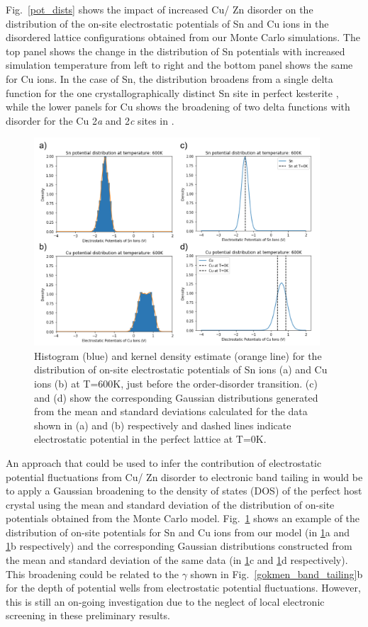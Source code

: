 \documentclass[11pt, twoside]{report}
\begin{document}
Fig.~\ref{pot_dists} shows the impact of increased Cu/ Zn disorder on the distribution of the on-site electrostatic potentials of Sn and Cu ions in the disordered lattice configurations obtained from our Monte Carlo simulations. The top panel shows the change in the distribution of Sn potentials with increased simulation temperature from left to right and the bottom panel shows the same for Cu ions. In the case of Sn, the distribution broadens from a single delta function for the one crystallographically distinct Sn site in perfect kesterite {\CZTS}, while the lower panels for Cu shows the broadening of two delta functions with disorder for the Cu 2\textit{a} and 2\textit{c} sites in {\CZTS}.

\begin{figure}[]
  \centering
    \includegraphics[width=0.95\textwidth]{figures/kde+gaussian.png}
    \caption{Histogram (blue) and kernel density estimate (orange line) for the distribution of on-site electrostatic potentials of Sn ions (a) and Cu ions (b) at T=600K, just before the order-disorder transition. (c) and (d) show the corresponding Gaussian distributions generated from the mean and standard deviations calculated for the data shown in (a) and (b) respectively and dashed lines indicate electrostatic potential in the perfect lattice at T=0K.}
  \label{kde+gaussian}
\end{figure}

An approach that could be used to infer the contribution of electrostatic potential fluctuations from Cu/ Zn disorder to electronic band tailing in {\CZTS} would be to apply a Gaussian broadening to the density of states (DOS) of the perfect host crystal using the mean and standard deviation of the distribution of on-site potentials obtained from the Monte Carlo model. Fig.~\ref{kde+gaussian} shows an example of the distribution of on-site potentials for Sn and Cu ions from our model (in \ref{kde+gaussian}a and \ref{kde+gaussian}b respectively) and the corresponding Gaussian distributions constructed from the mean and standard deviation of the same data (in \ref{kde+gaussian}c and \ref{kde+gaussian}d respectively). This broadening could be related to the $\gamma$ shown in Fig.~\ref{gokmen_band_tailing}b for the depth of potential wells from electrostatic potential fluctuations. However, this is still an on-going investigation due to the neglect of local electronic screening in these preliminary results.
\end{document}
